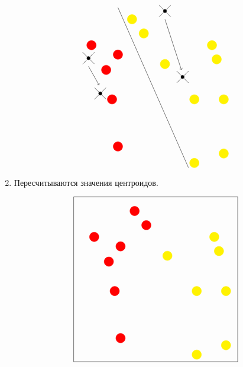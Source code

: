 \begin{enumerate}
\[\begin{tikzpicture}
\begin{scope}[xshift=7.5cm, yshift=7.5cm]
        \draw[red, fill=red] (-1.5, -2.5) circle (0.2);
        \draw[red, fill=red] (-1.75, -0.5) circle (0.2);
        \draw[red, fill=red] (-1.5, 1.4) circle (0.2);
        \draw[red, fill=red] (-2, 0.75) circle (0.2);
        \draw[red, fill=red] (-2.625, 1.8) circle (0.2);
        \draw[yellow, fill=yellow] (1.75, -3.2) circle (0.2);
        \draw[yellow, fill=yellow] (3, -2.8) circle (0.2);
        \draw[yellow, fill=yellow] (3, -0.5) circle (0.2);
        \draw[yellow, fill=yellow] (1.75, -0.5) circle (0.2);
        \draw[yellow, fill=yellow] (2.7, 1.2) circle (0.2);
        \draw[yellow, fill=yellow] (2.5, 1.8) circle (0.2);
        \draw[yellow, fill=yellow] (0.5, 1) circle (0.2);
        \draw[yellow, fill=yellow] (-0.4, 2.3) circle (0.2);
        \draw[yellow, fill=yellow] (-0.9, 2.9) circle (0.2); 
        \draw[black] (1.5, -3.4) -- (-1.5, 3.4);
        \draw[->][black] (-2.75, 0.9) -- (-2.3, 0.1);
        \draw[->][black] (0.5, 2.9) -- (1.2, 0.75);
        \draw[black] (-3, 1.5) -- (-2.5, 1);
        \draw[black] (-3, 1) -- (-2.5, 1.5);
        \draw[black] (0.25, 3) -- (0.75, 3.5);
        \draw[black] (0.25, 3.5) -- (0.75, 3);
        \filldraw[black](0.5, 3.25) circle (2pt);
        \filldraw[black] (-2.75 , 1.25) circle (2pt);
        \draw[black] (-2.5, -0.5) -- (-2, 0);
        \draw[black] (-2, -0.5) -- (-2.5, 0);
        \filldraw[black](-2.25, -0.25) circle (2pt);
        
        \draw[black] (1, 0.2) -- (1.5, 0.7);
        \draw[black] (1.5, 0.2) -- (1, 0.7);
        \filldraw[black](1.25, 0.45) circle (2pt);
        
    \end{scope}
\end{tikzpicture}
\]
\item Пересчитываются значения центроидов.

\[
\begin{tikzpicture}
        \begin{scope}
        \draw (-3.5, 3.5 ) -- (3.5, 3.5);
        \draw (-3.5, -3.5) -- (3.5, -3.5);
        \draw (-3.5, -3.5) -- (-3.5, 3.5);
        \draw (3.5, 3.5) -- (3.5, -3.5);
    
        \draw[red, fill=red] (-1.5, -2.5) circle (0.2);
        \draw[red, fill=red] (-1.75, -0.5) circle (0.2);
        \draw[red, fill=red] (-1.5, 1.4) circle (0.2);
        \draw[red, fill=red] (-2, 0.75) circle (0.2);
        \draw[red, fill=red] (-2.625, 1.8) circle (0.2);
        \draw[yellow, fill=yellow] (1.75, -3.2) circle (0.2);
        \draw[yellow, fill=yellow] (3, -2.8) circle (0.2);
        \draw[yellow, fill=yellow] (3, -0.5) circle (0.2);
        \draw[yellow, fill=yellow] (1.75, -0.5) circle (0.2);
        \draw[yellow, fill=yellow] (2.7, 1.2) circle (0.2);
        \draw[yellow, fill=yellow] (2.5, 1.8) circle (0.2);
        \draw[yellow, fill=yellow] (0.5, 1) circle (0.2);
        \draw[red, fill=red] (-0.4, 2.3) circle (0.2);
        \draw[red, fill=red] (-0.9, 2.9) circle (0.2); 
 


\end{scope}
\end{tikzpicture}\]
\end{enumerate}
